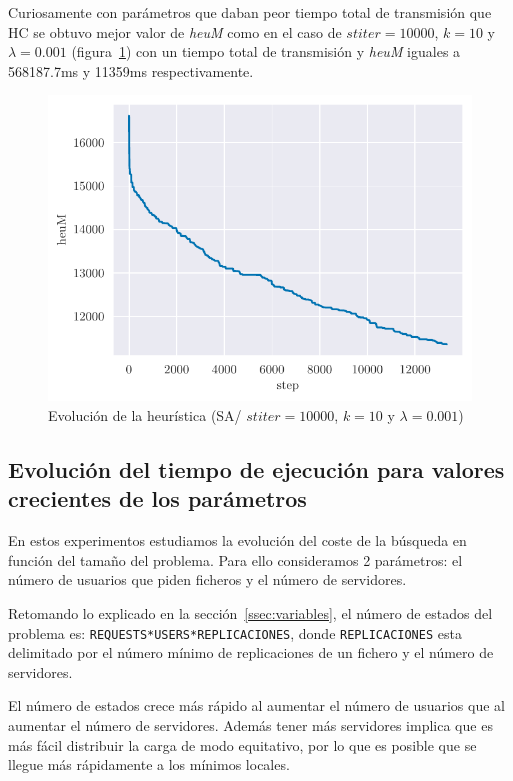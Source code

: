 Curiosamente con parámetros que daban peor tiempo total de transmisión que HC se obtuvo mejor valor de \emph{heuM} como en el caso de $stiter=10000$, $k=10$ y $\lambda=0.001$ (figura~\ref{fig:ex3_heu_steps-1000000-10000-10-0.001}) con un tiempo total de transmisión y \emph{heuM} iguales a 568187.7ms y 11359ms respectivamente.

\begin{figure}[H]
    \centering
    \includegraphics{include/plots/ex3_heu_steps-1000000-10000-10-0.001.pdf}
    \caption{Evolución de la heurística (SA/ $stiter=10000$, $k=10$ y $\lambda=0.001$)}
    \label{fig:ex3_heu_steps-1000000-10000-10-0.001} 
\end{figure}

\pagebreak


\subsection{Evolución del tiempo de ejecución para valores crecientes de los parámetros}

En estos experimentos estudiamos la evolución del coste de la búsqueda en función del tamaño del
problema. Para ello consideramos 2 parámetros: el número de usuarios que piden ficheros y el número
de servidores.

Retomando lo explicado en la sección~\ref{ssec:variables}, el número de estados del problema es:
\texttt{REQUESTS*USERS*REPLICACIONES}, donde \texttt{REPLICACIONES} esta delimitado por
el número mínimo de replicaciones de un fichero y el número de servidores.

\begin{hyp*}
El número de estados crece más rápido al aumentar el número de usuarios que al aumentar
el número de servidores. Además tener más servidores implica que es más fácil distribuir la carga de modo
equitativo, por lo que es posible que se llegue más rápidamente a los mínimos locales.
\end{hyp*}

